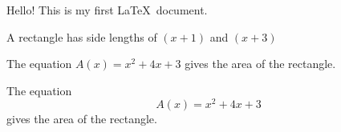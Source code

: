 \documentclass[11pt]{article}
\begin{document}
Hello! This is my first \LaTeX\ document.

A rectangle has side lengths of $(x+1)$ and $(x+3)$

The equation ${A(x) = x^2 + 4x + 3}$ gives the area of the rectangle.

The equation $${A(x) = x^2 + 4x + 3}$$ gives the area of the rectangle.
\end{document}
